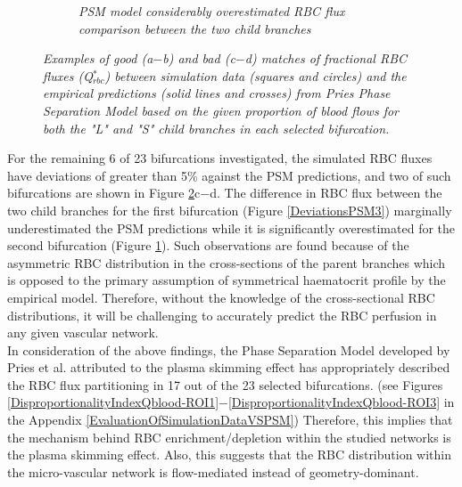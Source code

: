 \begin{figure}[H]
\begin{subfigure}{0.48 \textwidth}
    \caption{\textit{PSM model considerably overestimated RBC flux comparison between the two child branches} \label{DeviationsPSM4}}
\end{subfigure}
\caption{\textit{Examples of good (a$-$b) and bad (c$-$d) matches of fractional RBC fluxes (Q$^{*}_{rbc}$) between simulation data (squares and circles) and the empirical predictions (solid lines and crosses) from Pries Phase Separation Model based on the given proportion of blood flows for both the "L" and "S" child branches in each selected bifurcation.} \label{DeviationsPSM}}
\end{figure}

\noindent For the remaining 6 of 23 bifurcations investigated, the simulated RBC fluxes have deviations of greater than 5\% against the PSM predictions, and two of such bifurcations are shown in Figure \ref{DeviationsPSM}c$-$d. The difference in RBC flux between the two child branches for the first bifurcation (Figure \ref{DeviationsPSM3}) marginally underestimated the PSM predictions while it is significantly overestimated for the second bifurcation (Figure \ref{DeviationsPSM4}). Such observations are found because of the asymmetric RBC distribution in the cross-sections of the parent branches which is opposed to the primary assumption of symmetrical haematocrit profile by the empirical model. Therefore, without the knowledge of the cross-sectional RBC distributions, it will be challenging to accurately predict the RBC perfusion in any given vascular network. \\

\noindent In consideration of the above findings, the Phase Separation Model developed by Pries et al.\cite{A.R.Pries2005Mbvi, PriesAR1990BFiM} attributed to the plasma skimming effect has appropriately described the RBC flux partitioning in 17 out of the 23 selected bifurcations. (see Figures \ref{DisproportionalityIndexQblood-ROI1}$-$\ref{DisproportionalityIndexQblood-ROI3} in the Appendix \ref{EvaluationOfSimulationDataVSPSM}) Therefore, this implies that the mechanism behind RBC enrichment/depletion within the studied networks is the plasma skimming effect. Also, this suggests that the RBC distribution within the micro-vascular network is flow-mediated instead of geometry-dominant.



